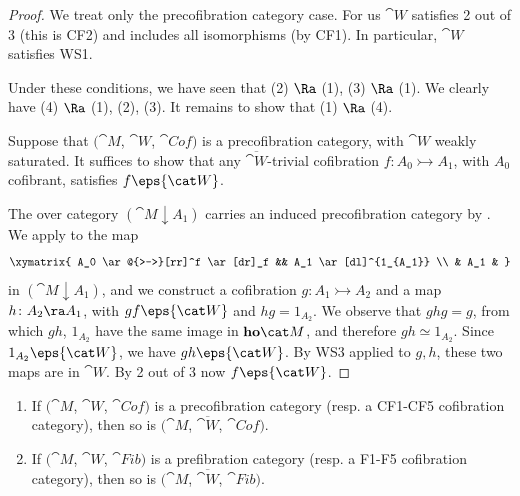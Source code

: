 \begin{proof}
We treat only the precofibration category case. For us ${\cat W}$ satisfies 2 out of 3 (this is CF2) and includes all isomorphisms (by CF1). In particular, ${\cat W}$ satisfies WS1.

Under these conditions, we have seen that (2) $\Ra$ (1), (3) $\Ra$ (1). We clearly have (4) $\Ra$ (1), (2), (3). It remains to show that (1) $\Ra$ (4).

Suppose that $({\cat M}$, ${\cat W}$, ${\cat Cof})$ is a precofibration category, with ${\cat W}$ weakly saturated. It suffices to show that any $\overline{\cat W}$-trivial cofibration $f \colon A_0 \rightarrowtail A_1$, with $A_0$ cofibrant, satisfies $f \eps {\cat W}$.

The over category $({\cat M} \downarrow A_1)$ carries an induced precofibration category by . We apply  to the map 
\[
\xymatrix{
  A_0 \ar@{>->}[rr]^f \ar[dr]_f && A_1 \ar[dl]^{1_{A_1}} \\
  & A_1 &
}
\]
in $({\cat M} \downarrow A_1)$, and we construct a cofibration $g \colon A_1 \rightarrowtail A_2$ and a map $h \colon A_2 \ra A_1$, with $gf \eps {\cat W}$ and $hg = 1_{A_{2}}$. We observe that $ghg = g$, from which $gh$, $1_{A_2}$ have the same image in ${\bf ho}{\cat M}$, and therefore $gh \simeq 1_{A_2}$. Since $1_{A_2} \eps {\cat W}$, we have $gh \eps {\cat W}$. By WS3 applied to $g, h$, these two maps are in ${\cat W}$. By 2 out of 3 now $f \eps {\cat W}$.
\end{proof}

\begin{thm}[Cisinski]
\label{thm::cofcatsaturation}
\mbox{}
\begin{enumerate}
\item
If $({\cat M}$, ${\cat W}$, ${\cat Cof})$ is a precofibration category (resp. a CF1-CF5 cofibration category), then so is $({\cat M}$, $\overline{\cat W}$, ${\cat Cof})$. 
\item
If $({\cat M}$, ${\cat W}$, ${\cat Fib})$ is a prefibration category (resp. a F1-F5 cofibration category), then so is $({\cat M}$, $\overline{\cat W}$, ${\cat Fib})$. 
\end{enumerate}
\end{thm}

